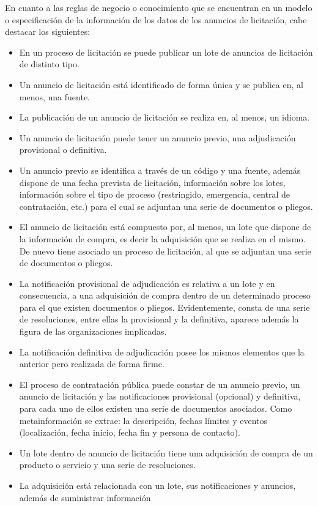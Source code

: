 En cuanto a las reglas de negocio o conocimiento que se encuentran en un modelo o especificación 
de la información de los datos de los anuncios de licitación, cabe destacar los siguientes:
\begin{itemize}
 \item En un proceso de licitación se puede publicar un lote de anuncios de licitación 
de distinto tipo.
\item Un anuncio de licitación está identificado de forma única y se publica en, al menos, una fuente.
\item La publicación de un anuncio de licitación se realiza en, al menos, un idioma.
\item Un anuncio de licitación puede tener un anuncio previo, una adjudicación provisional o definitiva.
\item Un anuncio previo se identifica a través de un código y una fuente, además dispone de una fecha 
prevista de licitación, información sobre los lotes, información sobre el tipo de proceso (restringido, 
emergencia, central de contratación, etc.) para el cual se adjuntan una serie de documentos o pliegos.
\item El anuncio de licitación está compuesto por, al menos, un lote que dispone de la información 
de compra, es decir la adquisición que se realiza en el mismo. De nuevo tiene asociado un proceso 
de licitación, al que se adjuntan una serie de documentos o pliegos.
\item La notificación provisional de adjudicación es relativa a un lote y en consecuencia, a una 
adquisición de compra dentro de un determinado proceso para el que existen documentos o pliegos. Evidentemente, 
consta de una serie de resoluciones, entre ellas la provisional y la definitiva, aparece además la figura de las organizaciones implicadas.
\item La notificación definitiva de adjudicación posee los mismos elementos que la anterior pero realizada 
de forma firme.
\item El proceso de contratación pública puede constar de un anuncio previo, un anuncio de licitación y las notificaciones 
provisional (opcional) y definitiva, para cada uno de ellos existen una serie de documentos asociados. Como metainformación 
se extrae: la descripción, fechas límites y eventos (localización, fecha inicio, fecha fin y persona de contacto).
\item Un lote dentro de anuncio de licitación tiene una adquisición de compra de un producto o servicio y una serie 
de resoluciones.
\item La adquisición está relacionada con un lote, sus notificaciones y anuncios, además de suministrar información 

\end{itemize}
